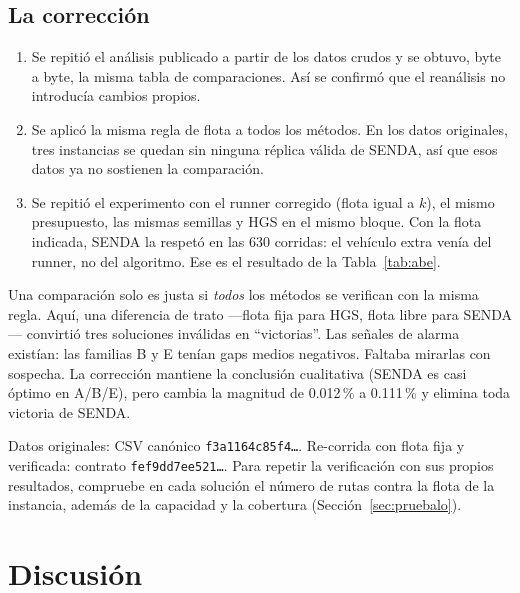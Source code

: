 \documentclass[11pt,a4paper]{article}
\newcommand{\tsl}[1]{\texttt{\small #1}}
\begin{document}
\subsection{La corrección}
\begin{enumerate}[leftmargin=1.5em]
\item Se repitió el análisis publicado a partir de los datos crudos y se obtuvo, byte a byte, la
misma tabla de comparaciones. Así se confirmó que el reanálisis no introducía cambios propios.
\item Se aplicó la misma regla de flota a todos los métodos. En los datos originales, tres
instancias se quedan sin ninguna réplica válida de SENDA, así que esos datos ya no sostienen la
comparación.
\item Se repitió el experimento con el runner corregido (flota igual a $k$), el mismo presupuesto,
las mismas semillas y HGS en el mismo bloque. Con la flota indicada, SENDA la respetó en las 630
corridas: el vehículo extra venía del runner, no del algoritmo. Ese es el resultado de la
Tabla~\ref{tab:abe}.
\end{enumerate}

\begin{leccion}
Una comparación solo es justa si \emph{todos} los métodos se verifican con la misma regla. Aquí, una
diferencia de trato ---flota fija para HGS, flota libre para SENDA--- convirtió tres soluciones
inválidas en ``victorias''. Las señales de alarma existían: las familias B y E tenían gaps medios
negativos. Faltaba mirarlas con sospecha. La corrección mantiene la conclusión cualitativa (SENDA es
casi óptimo en A/B/E), pero cambia la magnitud de 0.012\,\% a 0.111\,\% y elimina toda victoria de
SENDA.
\end{leccion}

\begin{reproducir}
Datos originales: CSV canónico \tsl{f3a1164c85f4\ldots}. Re-corrida con flota fija y verificada:
contrato \tsl{fef9dd7ee521\ldots}. Para repetir la verificación con sus propios resultados, compruebe
en cada solución el número de rutas contra la flota de la instancia, además de la capacidad y la
cobertura (Sección~\ref{sec:pruebalo}).
\end{reproducir}

\section{Discusión}
\label{sec:discusion}
\end{document}
